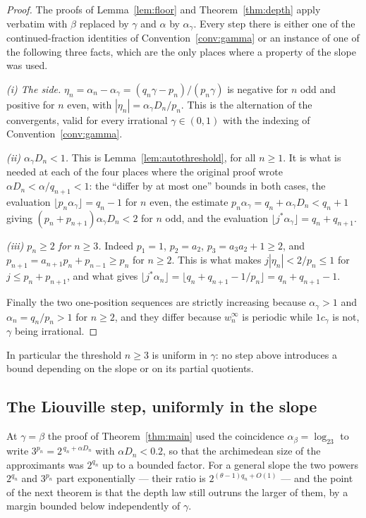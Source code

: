 \documentclass[11pt,reqno]{amsart}
\theoremstyle{plain}
\theoremstyle{definition}
\begin{document}
\begin{proof}
The proofs of Lemma~\ref{lem:floor} and Theorem~\ref{thm:depth} apply verbatim
with $\beta$ replaced by $\gamma$ and $\alpha$ by $\alpha_\gamma$. Every step
there is either one of the continued-fraction identities of
Convention~\ref{conv:gamma} or an instance of one of the following three facts,
which are the only places where a property of the slope was used.

\emph{(i) The side.} $\eta_n=\alpha_n-\alpha_\gamma=(q_n\gamma-p_n)/(p_n\gamma)$
is negative for $n$ odd and positive for $n$ even, with
$|\eta_n|=\alpha_\gamma D_n/p_n$. This is the alternation of the convergents,
valid for every irrational $\gamma\in(0,1)$ with the indexing of
Convention~\ref{conv:gamma}.

\emph{(ii) $\alpha_\gamma D_n<1$.} This is Lemma~\ref{lem:autothreshold}, for
all $n\ge1$. It is what is needed at each of the four places where the original
proof wrote $\alpha D_n<\alpha/q_{n+1}<1$: the ``differ by at most one'' bounds
in both cases, the evaluation $\lfloor p_n\alpha_\gamma\rfloor=q_n-1$ for $n$
even, the estimate $p_n\alpha_\gamma=q_n+\alpha_\gamma D_n<q_n+1$ giving
$(p_n+p_{n+1})\alpha_\gamma D_n<2$ for $n$ odd, and the evaluation
$\lfloor j^{*}\alpha_\gamma\rfloor=q_n+q_{n+1}$.

\emph{(iii) $p_n\ge2$ for $n\ge3$.} Indeed $p_1=1$, $p_2=a_2$,
$p_3=a_3a_2+1\ge2$, and $p_{n+1}=a_{n+1}p_n+p_{n-1}\ge p_n$ for $n\ge2$. This
is what makes $j|\eta_n|<2/p_n\le1$ for $j\le p_n+p_{n+1}$, and what gives
$\lfloor j^{*}\alpha_n\rfloor=\lfloor q_n+q_{n+1}-1/p_n\rfloor=q_n+q_{n+1}-1$.

Finally the two one-position sequences are strictly increasing because
$\alpha_\gamma>1$ and $\alpha_n=q_n/p_n>1$ for $n\ge2$, and they differ because
$w_n^\infty$ is periodic while $1c_\gamma$ is not, $\gamma$ being irrational.
\end{proof}

\noindent In particular the threshold $n\ge3$ is uniform in $\gamma$: no step
above introduces a bound depending on the slope or on its partial quotients.

\subsection*{The Liouville step, uniformly in the slope}

At $\gamma=\beta$ the proof of Theorem~\ref{thm:main} used the coincidence
$\alpha_\beta=\log_23$ to write $3^{p_n}=2^{\,q_n+\alpha D_n}$ with
$\alpha D_n<0.2$, so that the archimedean size of the approximants was
$2^{q_n}$ up to a bounded factor. For a general slope the two powers $2^{q_n}$
and $3^{p_n}$ part exponentially --- their ratio is
$2^{(\theta-1)q_n+O(1)}$ --- and the point of the next theorem is that the
depth law still outruns the larger of them, by a margin bounded below
independently of $\gamma$.
\end{document}
